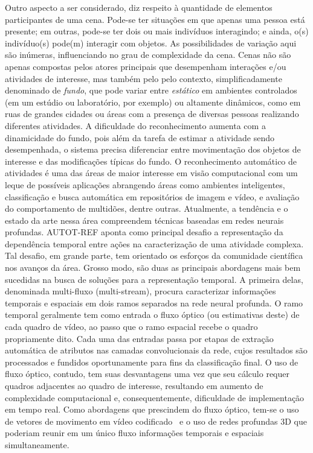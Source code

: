 Outro aspecto a ser considerado, diz respeito à quantidade de elementos participantes de uma cena. Pode-se ter situações em que apenas uma pessoa está presente; em outras, pode-se ter dois ou mais indivíduos interagindo; e ainda, o(s) indivíduo(s) pode(m) interagir com objetos. As possibilidades de variação aqui são inúmeras, influenciando no grau de complexidade da cena.
Cenas não são apenas compostas pelos atores principais que desempenham interações e/ou atividades de interesse, mas também pelo pelo contexto, simplificadamente denominado de \emph{fundo}, que pode variar entre \emph{estático} em ambientes controlados (em um estúdio ou laboratório, por exemplo) ou altamente dinâmicos, como em ruas de grandes cidades ou áreas com a presença de diversas pessoas realizando diferentes atividades. A dificuldade do reconhecimento aumenta com a dinamicidade do fundo, pois além da tarefa de estimar a atividade sendo desempenhada, o sistema precisa diferenciar entre movimentação dos objetos de interesse e das modificações típicas do fundo.
O reconhecimento automático de atividades é uma das áreas de maior interesse em visão computacional com um leque de possíveis aplicações abrangendo áreas como ambientes inteligentes, classificação e busca automática em repositórios de imagem e vídeo, e avaliação do comportamento de multidões, dentre outras.
%
Atualmente, a tendência e o estado da arte nessa área compreendem técnicas baseadas em redes neurais profundas. AUTOT-REF aponta como principal desafio a representação da dependência temporal entre ações na caracterização de uma atividade complexa. Tal desafio, em grande parte, tem orientado os esforços da comunidade científica nos avanços da área. 
%
Grosso modo, são duas as principais abordagens mais bem sucedidas na busca de soluções para a representação temporal. A primeira delas, denominada multi-fluxo (multi-stream), procura caracterizar informações temporais e espaciais em dois ramos separados na rede neural profunda. O ramo temporal geralmente tem como entrada o fluxo óptico (ou estimativas deste) de cada quadro de vídeo, ao passo que o ramo espacial recebe o quadro propriamente dito. Cada uma das entradas passa por etapas de extração automática de atributos nas camadas convolucionais da rede, cujos resultados são processados e fundidos oportunamente para fins da classificação final. O uso de fluxo óptico, contudo, tem suas desvantagens uma vez que seu cálculo requer quadros adjacentes ao quadro de interesse, resultando em aumento de complexidade computacional e, consequentemente, dificuldade de implementação em tempo real. Como abordagens que prescindem do fluxo óptico, tem-se o uso de vetores de movimento em vídeo codificado~ e o uso de redes profundas 3D que poderiam reunir em um único fluxo informações temporais e espaciais simultaneamente. 
